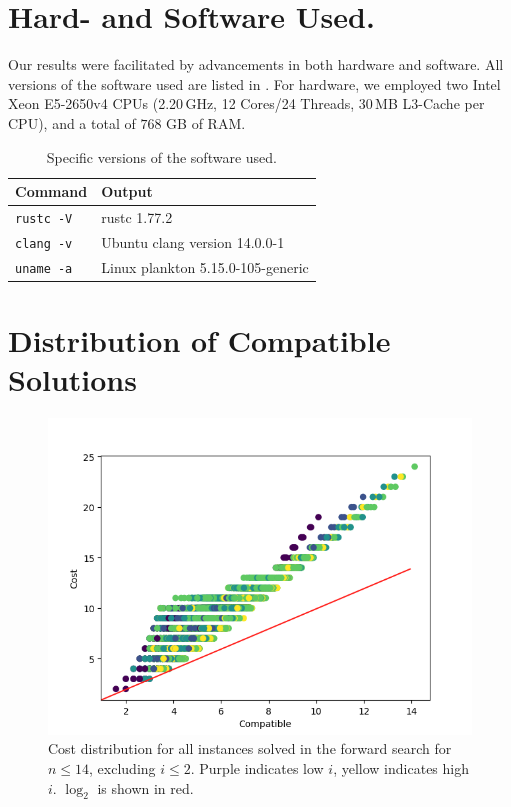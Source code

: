 \documentclass[twoside,leqno,twocolumn]{article}
\begin{document}




\section{Hard- and Software Used.} \label{sec:hardware}

Our results were facilitated by advancements in both hardware and software.
All versions of the software used are listed in .
For hardware, we employed two Intel Xeon E5-2650v4 CPUs (2.20\,GHz, 12 Cores/24 Threads, 30\,MB L3-Cache per CPU), and a total of $768$ GB of RAM.

\begin{table}[!t]
  \renewcommand{\arraystretch}{1.1}
  \caption{Specific versions of the software used.}
  \label{table:command_outputs}
  \centering
  \small
  \begin{tabular}{l|l}
    \textbf{Command}  & \textbf{Output}                   \\ \hline
    \texttt{rustc -V} & rustc 1.77.2                      \\ \hline
    \texttt{clang -v} & Ubuntu clang version 14.0.0-1     \\ \hline
    \texttt{uname -a} & Linux plankton 5.15.0-105-generic \\
  \end{tabular}
\end{table}

\section{Distribution of Compatible Solutions}

\begin{figure}[h]
  \includegraphics*[scale=0.5]{figures/compatible_cost_relation.png}
  \caption*{Cost distribution for all instances solved in the forward search for $n \leq 14$, excluding $i \leq 2$.
    Purple indicates low $i$, yellow indicates high $i$. $\log_2$ is shown in red.}
\end{figure}
\end{document}
